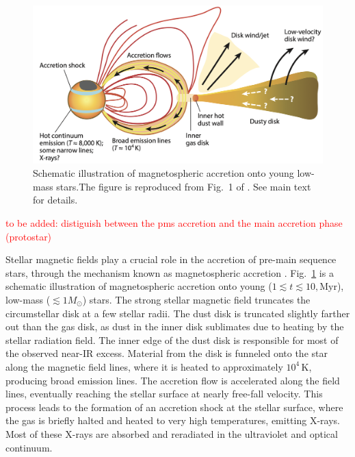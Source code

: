 \documentclass[12pt,a4paper]{article}
\newcommand{\mr}{\mathrm}
\newcommand{\qt}[1]{\textcolor{red}{#1}}
\begin{document}
\begin{figure}
  \centering
  \includegraphics[width=.8\textwidth]{HartmannEtAl2016_magnetospheric_accretion.png}
  \caption{Schematic illustration of magnetospheric accretion onto young low-mass stars.The figure is reproduced from Fig.~1 of \textcite{HartmannEtAl2016}. See main text for details.}
  \label{fig:magnetospheric_accretion}
\end{figure}

\qt{to be added: distiguish between the pms accretion and the main accretion phase (protostar)}\par

Stellar magnetic fields play a crucial role in the accretion of pre-main sequence stars, through the mechanism known as magnetospheric accretion \parencite[See, for example,][for a review]{HartmannEtAl2016}. Fig.~\ref{fig:magnetospheric_accretion} is a schematic illustration of magnetospheric accretion onto young ($1 \lesssim t \lesssim 10,\mr{Myr}$), low-mass ($\lesssim 1 M_\odot$) stars. The strong stellar magnetic field truncates the circumstellar disk at a few stellar radii. The dust disk is truncated slightly farther out than the gas disk, as dust in the inner disk sublimates due to heating by the stellar radiation field. The inner edge of the dust disk is responsible for most of the observed near-IR excess. Material from the disk is funneled onto the star along the magnetic field lines, where it is heated to approximately $10^4\,\mr{K}$, producing broad emission lines. The accretion flow is accelerated along the field lines, eventually reaching the stellar surface at nearly free-fall velocity. This process leads to the formation of an accretion shock at the stellar surface, where the gas is briefly halted and heated to very high temperatures, emitting X-rays. Most of these X-rays are absorbed and reradiated in the ultraviolet and optical continuum.
\end{document}
